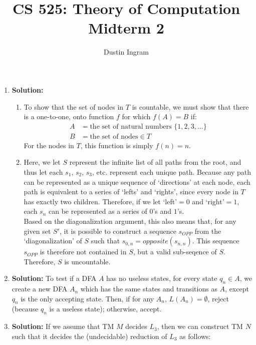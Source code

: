 \documentclass{article}
\title{CS 525: Theory of Computation\\ Midterm 2}
\author{Dustin Ingram}
\begin{document}
\maketitle
\begin{enumerate}
    \item \textbf{Solution:}
    \begin{enumerate}
        \item To show that the set of nodes in $T$ is countable, we must show that there is a one-to-one, onto function $f$ for which $f(A)=B$ if:
        \begin{align*}
            A &= \text{the set of natural numbers } \{1,2,3,\dots\} \\
            B &= \text{the set of nodes} \in T
        \end{align*}
        For the nodes in $T$, this function is simply $f(n) = n$.
        \item Here, we let $S$ represent the infinite list of all paths from the root, and thus let each $s_{1}$, $s_{2}$, $s_{3}$, etc. represent each unique path. Because any path can be represented as a unique sequence of `directions' at each node, each path is equivalent to a series of `lefts' and `rights', since every node in $T$ has exactly two children. Therefore, if we let `left'$=0$ and `right'$=1$, each $s_{n}$ can be represented as a series of $0$'s and $1$'s. \\
        Based on the diagonalization argument, this also means that, for any given set $S'$, it is possible to construct a sequence $s_{OPP}$ from the `diagonalization' of $S$ such that $s_{0,n} = opposite(s_{n,n})$. This sequence $s_{OPP}$ is therefore not contained in $S$, but a valid sub-seqence of $S$. Therefore, $S$ is uncountable.
    \end{enumerate}
    \item \textbf{Solution:}
    To test if a DFA $A$ has no useless states, for every state $q_{n} \in A$, we create a new DFA $A_{n}$ which has the same states and transitions as $A$, except $q_{n}$ is the only accepting state. Then, if for any $A_{n}$, $L(A_{n}) = \emptyset$, reject (because $q_{n}$ is a useless state); otherwise, accept. 
    \item \textbf{Solution:}
    If we assume that TM $M$ decides $L_{3}$, then we can construct TM $N$ such that it decides the (undecidable) reduction of $L_{3}$ as follows: \\


\end{enumerate}
\end{document}
